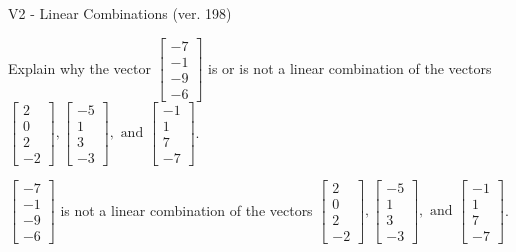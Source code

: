 \begin{exercise}
  \begin{exerciseTitle}V2 - Linear Combinations (ver. 198)\end{exerciseTitle}
  \begin{exerciseStatement}
    Explain why the vector \(\left[\begin{array}{c}
-7 \\
-1 \\
-9 \\
-6
\end{array}\right]\)  is or is not a linear 
	combination of the vectors \(\left[\begin{array}{c}
2 \\
0 \\
2 \\
-2
\end{array}\right] , \left[\begin{array}{c}
-5 \\
1 \\
3 \\
-3
\end{array}\right] , \text{ and } \left[\begin{array}{c}
-1 \\
1 \\
7 \\
-7
\end{array}\right]\).
	


  \end{exerciseStatement}
  \begin{exerciseAnswer}
   \(\left[\begin{array}{c}
-7 \\
-1 \\
-9 \\
-6
\end{array}\right]\) 
  	 is not  
	a linear combination of the vectors \(\left[\begin{array}{c}
2 \\
0 \\
2 \\
-2
\end{array}\right] , \left[\begin{array}{c}
-5 \\
1 \\
3 \\
-3
\end{array}\right] , \text{ and } \left[\begin{array}{c}
-1 \\
1 \\
7 \\
-7
\end{array}\right]\).

	
  


  \end{exerciseAnswer}
\end{exercise}